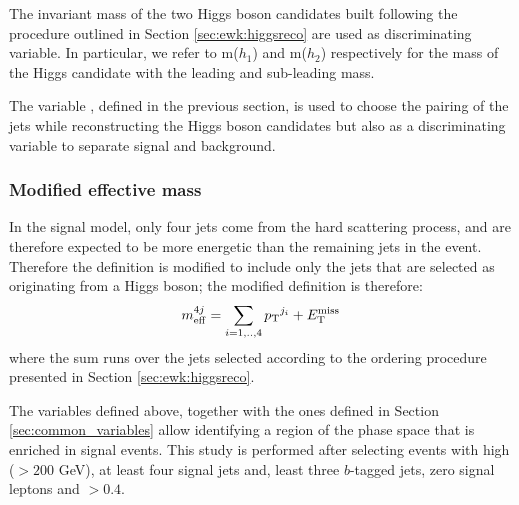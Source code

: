 The invariant mass of the two Higgs boson candidates built following the procedure outlined in Section \ref{sec:ewk:higgsreco} 
are used as discriminating variable. In particular, we refer to m($h_1$) and m($h_2$) respectively for the mass of the Higgs candidate with 
the leading and sub-leading mass.

The variable \dRmax, defined in the previous section, is used to choose the pairing of the jets while reconstructing 
the Higgs boson candidates but also as a discriminating variable to separate signal and background. 

\subsubsection*{Modified effective mass}

In the signal model, only four jets come from the hard scattering process, and are therefore expected to be more energetic than the 
remaining jets in the event. Therefore the \meff definition is modified to include only the jets that are selected 
as originating from a Higgs boson; the modified definition is therefore:
\begin{equation}
m_{\mathrm{eff}}^{4j} = \sum_{i=1,..,4} {p_{\rm T}}^{j_i} + E_{\rm T}^{\mathrm{miss}}
\end{equation}
\noindent where the sum runs over the jets selected according to the ordering procedure presented in Section \ref{sec:ewk:higgsreco}. 


The variables defined above, together with the ones defined in Section \ref{sec:common_variables} 
allow identifying a region of the phase space that is enriched in signal events. 
This study is performed after selecting events with high \met ($> 200$ GeV), at least four signal jets and, least three $b$-tagged jets, zero signal leptons and \dphimin $>0.4$.

